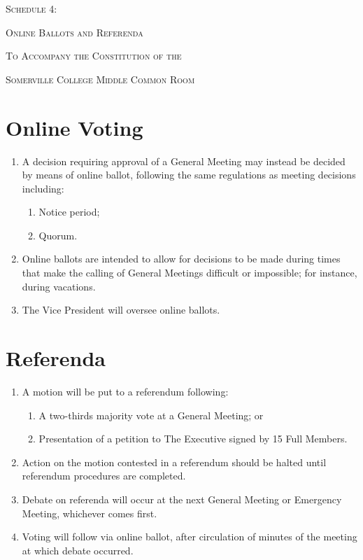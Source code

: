 \documentclass[11pt, a4paper]{article}
\begin{document}
\clearpage
\setcounter{section}{0}





\centerline{{\Huge \textsc{Schedule 4:}}}
\vspace{2mm}
\centerline{{\Huge \textsc{Online Ballots and Referenda}}}
\vspace{2mm}
\centerline{{\Large \textsc{To Accompany the Constitution of the}}}
\vspace{2mm}
\centerline{{\Large \textsc{Somerville College Middle Common Room}}}





\section{Online Voting}
\label{sec:online_voting}

\begin{enumerate}
	\item A decision requiring approval of a General Meeting may instead be decided by means of online ballot, following the same regulations as meeting decisions including:
    	\begin{enumerate}
        	\item Notice period;
            \item Quorum.
        \end{enumerate}
    \item Online ballots are intended to allow for decisions to be made during times that make the calling of General Meetings difficult or impossible; for instance, during vacations.
    \item The Vice President will oversee online ballots.
\end{enumerate}





\section{Referenda}
\label{sec:referenda}

\begin{enumerate}
	\item A motion will be put to a referendum following:
    	\begin{enumerate}
        	\item A two-thirds majority vote at a General Meeting; or
            \item Presentation of a petition to The Executive signed by 15 Full Members.
        \end{enumerate}
	\item Action on the motion contested in a referendum should be halted until referendum procedures are completed.
    \item Debate on referenda will occur at the next General Meeting or Emergency Meeting, whichever comes first.
    \item Voting will follow via online ballot, after circulation of minutes of the meeting at which debate occurred.
\end{enumerate}
\end{document}
